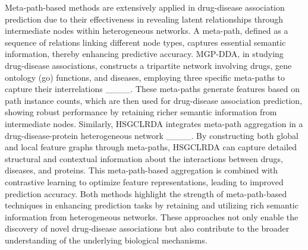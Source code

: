 Meta-path-based methods are extensively applied in drug-disease association prediction due to their effectiveness in revealing latent relationships through intermediate nodes within heterogeneous networks. A meta-path, defined as a sequence of relations linking different node types, captures essential semantic information, thereby enhancing predictive accuracy. MGP-DDA, in studying drug-disease associations, constructs a tripartite network involving drugs, gene ontology (go) functions, and diseases, employing three specific meta-paths to capture their interrelations ____. These meta-paths generate features based on path instance counts, which are then used for drug-disease association prediction, showing robust performance by retaining richer semantic information from intermediate nodes. Similarly, HSGCLRDA integrates meta-path aggregation in a drug-disease-protein heterogeneous network ____. By constructing both global and local feature graphs through meta-paths, HSGCLRDA can capture detailed structural and contextual information about the interactions between drugs, diseases, and proteins. This meta-path-based aggregation is combined with contrastive learning to optimize feature representations, leading to improved prediction accuracy. Both methods highlight the strength of meta-path-based techniques in enhancing prediction tasks by retaining and utilizing rich semantic information from heterogeneous networks. These approaches not only enable the discovery of novel drug-disease associations but also contribute to the broader understanding of the underlying biological mechanisms.